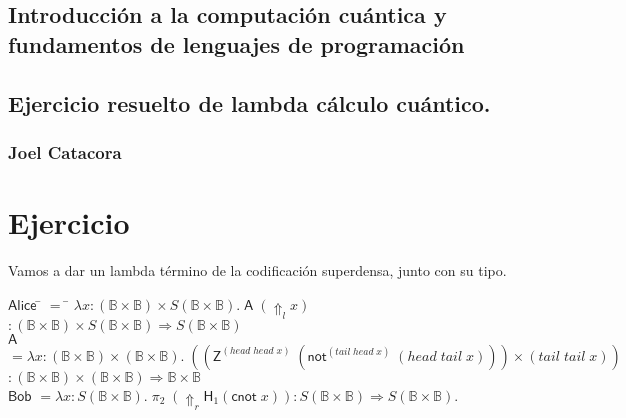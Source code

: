 \documentclass[a4paper,11pt]{article}
\title{}
\author{}
\begin{document}
\maketitle 

\thispagestyle{empty}
\begin{center}
\section*{Introducción a  la computación cuántica y fundamentos de lenguajes de programación} 
\subsection*{Ejercicio resuelto de lambda cálculo cuántico.}
\subsubsection*{Joel Catacora}

\end{center}

\newpage{\pagestyle{empty}\cleardoublepage}

\newpage

\section*
{Ejercicio}

Vamos a dar un lambda término de la codificación superdensa, junto con su tipo.

\begin{tabbing}
  $ \textsf{Alice}$ \= $=$ \= $\lambda x : (\mathds{B} \times \mathds{B}) \times S (\mathds{B} \times \mathds{B}). \; \textsf{A} \; (\Uparrow_{l} x)$ \\
  \> \> $: (\mathds{B} \times  \mathds{B}) \times S(\mathds{B} \times \mathds{B}) \Rightarrow S(\mathds{B} \times \mathds{B})$ \\

  $ \textsf{A}$ \> $= \lambda x: (\mathds{B} \times \mathds{B}) \times (\mathds{B} \times \mathds{B}). \; ((\textsf{Z}^{(head \; head \; x)}\; 
  (\textsf{not}^{(tail \; head \; x)} \; (head \; tail \; x))) \times (tail \; tail \; x))$ \\

  \>  \> $: (\mathds{B} \times  \mathds{B}) \times (\mathds{B} \times  \mathds{B}) \Rightarrow \mathds{B} \times \mathds{B}$ \\

  $\textsf{Bob}$ \> $= \lambda x : S(\mathds{B} \times \mathds{B}). \; \pi_{2} \; (\Uparrow_{r} \textsf{H}_{1} (\textsf{cnot} \; x)) 
  : S(\mathds{B} \times \mathds{B}) \Rightarrow S(\mathds{B} \times \mathds{B}).$

\end{tabbing}
\end{document}
